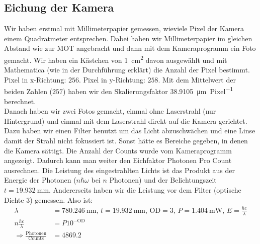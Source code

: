 \documentclass[12pt, a4paper]{article}
\begin{document}
  \subsection{Eichung der Kamera}
  \label{eichung}
  Wir haben erstmal mit Millimeterpapier gemessen, wieviele Pixel der Kamera einem Quadratmeter entsprechen. Dabei haben wir Millimeterpapier im gleichen Abstand wie zur MOT angebracht und dann mit dem Kameraprogramm ein Foto gemacht. Wir haben ein Kästchen von \SI{1}{\cm^2} davon ausgewählt und mit Mathematica (wie in der Durchführung erklärt) die Anzahl der Pixel bestimmt. Pixel in x-Richtung: $256$. Pixel in y-Richtung: $258$. Mit dem Mittelwert der beiden Zahlen ($257$) haben wir den Skalierungsfaktor \SI{38.9105}{\micro\m\per Pixel} berechnet.\\
  Danach haben wir zwei Fotos gemacht, einmal ohne Laserstrahl (nur Hintergrund) und einmal mit dem Laserstrahl direkt auf die Kamera gerichtet. Dazu haben wir einen Filter benutzt um das Licht abzuschwächen und eine Linse damit der Strahl nicht fokussiert ist. Sonst hätte es Bereiche gegeben, in denen die Kamera sättigt. Die Anzahl der Counts wurde vom Kameraprogramm angezeigt. Dadurch kann man weiter den Eichfaktor Photonen Pro Count ausrechnen. Die Leistung des eingestrahlten Lichts ist das Produkt aus der Energie der Photonen ($n\hbar\omega$ bei $n$ Photonen) und der Belichtungszeit $t=\SI{19.932}{\mm}$. Andererseits haben wir die Leistung vor dem Filter (optische Dichte 3) gemessen. Also ist:
  \begin{align*}
  \lambda &=\SI{780.246}{\nano\m},\, t=\SI{19.932}{\milli\m},\, \text{OD}=3,\, P=\SI{1.404}{\milli\W},\, E=\frac{h c}{\lambda} \\
  n \frac{h c}{\lambda}&=P 10^{-\text{OD}} \\
  \Rightarrow \frac{\text{Photonen}}{\text{Counts}} &=4869.2
  \end{align*}
\end{document}
